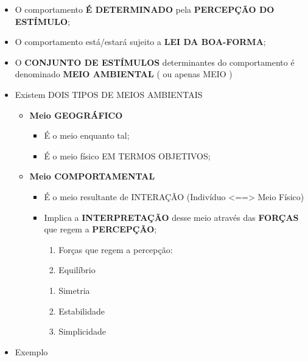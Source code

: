 \documentclass[
]{book}
\providecommand{\tightlist}{%
  \setlength{\itemsep}{0pt}\setlength{\parskip}{0pt}}
\begin{document}
\begin{itemize}
\tightlist
\item
  O comportamento \textbf{É DETERMINADO} pela \textbf{PERCEPÇÃO DO
  ESTÍMULO};
\item
  O comportamento está/estará sujeito a \textbf{LEI DA BOA-FORMA};
\item
  O \textbf{CONJUNTO DE ESTÍMULOS} determinantes do comportamento é
  denominado \textbf{MEIO AMBIENTAL} ( ou apenas MEIO )
\item
  Existem DOIS TIPOS DE MEIOS AMBIENTAIS

  \begin{itemize}
  \tightlist
  \item
    \textbf{Meio GEOGRÁFICO}

    \begin{itemize}
    \tightlist
    \item
      É o meio enquanto tal;
    \item
      É o meio físico EM TERMOS OBJETIVOS;
    \end{itemize}
  \item
    \textbf{Meio COMPORTAMENTAL}

    \begin{itemize}
    \tightlist
    \item
      É o meio resultante de INTERAÇÃO (Indivíduo
      \textless==\textgreater{} Meio Físico)
    \item
      Implica a \textbf{INTERPRETAÇÃO} desse meio através das
      \textbf{FORÇAS} que regem a \textbf{PERCEPÇÃO};

      \begin{enumerate}
      \def\labelenumi{\alph{enumi}.}
      \tightlist
      \item
        Forças que regem a percepção:
      \item
        Equilíbrio
      \end{enumerate}

      \begin{enumerate}
      \def\labelenumi{\roman{enumi}.}
      \setcounter{enumi}{1}
      \tightlist
      \item
        Simetria
      \item
        Estabilidade
      \item
        Simplicidade
      \end{enumerate}
    \end{itemize}
  \end{itemize}
\item
  Exemplo


\end{itemize}
\end{document}
